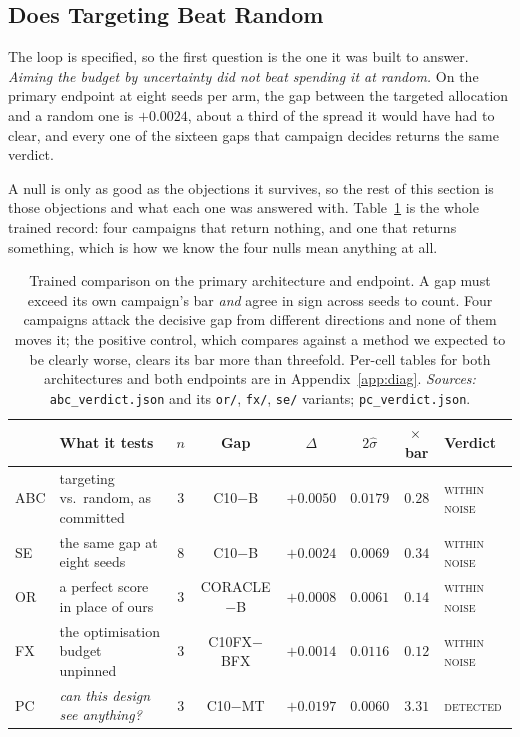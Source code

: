 \documentclass{article}
\begin{document}
\subsection{Does Targeting Beat Random}
\label{sec:null}
The loop is specified, so the first question is the one it was built to answer. \textit{Aiming the budget by uncertainty did not beat spending it at random.} On the primary endpoint at eight seeds
per arm, the gap between the targeted allocation and a random one is $+0.0024$, about a third of
the spread it would have had to clear, and every one of the sixteen gaps that campaign decides
returns the same verdict.

A null is only as good as the objections it survives, so the rest of this section is those
objections and what each one was answered with. Table~\ref{tab:trained} is the whole trained record: four campaigns that return nothing, and one that returns something, which is how we know the four
nulls mean anything at all.

\begin{table}[t]
\caption{Trained comparison on the primary architecture and endpoint. A gap must
exceed its own campaign's bar \emph{and} agree in sign across seeds to count. Four campaigns attack
the decisive gap from different directions and none of them moves it; the positive control, which
compares against a method we expected to be clearly worse, clears its bar more than threefold.
Per-cell tables for both architectures and both endpoints are in Appendix~\ref{app:diag}.
\emph{Sources:} \texttt{abc\_verdict.json} and its \texttt{or/}, \texttt{fx/}, \texttt{se/}
variants; \texttt{pc\_verdict.json}.}
\label{tab:trained}
\begin{center}
\small
\setlength{\tabcolsep}{4pt}
\begin{tabular}{@{}llcccccl@{}}
\toprule
& What it tests & $n$ & Gap & $\Delta$ & $2\hat{\sigma}$ & $\times$\,bar & Verdict \\
\midrule
ABC & targeting vs.\ random, as committed & $3$ & C10$-$B & $+0.0050$ & $0.0179$ & $0.28$ & \textsc{within noise} \\
SE & the same gap at eight seeds & $8$ & C10$-$B & $+0.0024$ & $0.0069$ & $0.34$ & \textsc{within noise} \\
OR & a perfect score in place of ours & $3$ & CORACLE$-$B & $+0.0008$ & $0.0061$ & $0.14$ & \textsc{within noise} \\
FX & the optimisation budget unpinned & $3$ & C10FX$-$BFX & $+0.0014$ & $0.0116$ & $0.12$ & \textsc{within noise} \\
\midrule
PC & \emph{can this design see anything?} & $3$ & C10$-$MT & $+0.0197$ & $0.0060$ & $\mathbf{3.31}$ & \textsc{detected} \\
\bottomrule
\end{tabular}
\end{center}
\end{table}
\end{document}
